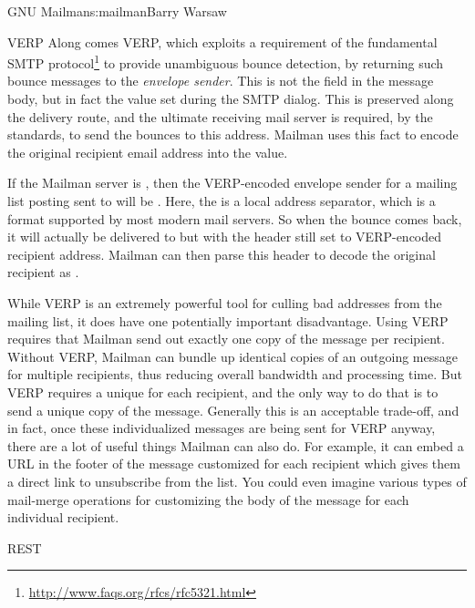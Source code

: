 \begin{aosachapter}{GNU Mailman}{s:mailman}{Barry Warsaw}
\begin{aosasect1}{VERP}
Along comes VERP, which exploits a requirement of the fundamental SMTP
protocol\footnote{\url{http://www.faqs.org/rfcs/rfc5321.html}} to
provide unambiguous bounce detection, by returning such bounce
messages to the \emph{envelope sender}.  This is not the 
field in the message body, but in fact the  value set
during the SMTP dialog.  This is preserved along the delivery route,
and the ultimate receiving mail server is required, by the standards, to
send the bounces to this address.  Mailman uses this fact to encode
the original recipient email address into the  value.

If the Mailman server is
, then the VERP-encoded envelope sender for a mailing list
posting sent to  will be
.  Here, the \code{+}
is a local address separator, which is a format supported by most
modern mail servers.  So when the bounce comes back, it will actually
be delivered to  but with the
 header still set to VERP-encoded recipient address.
Mailman can then parse this  header to decode the original
recipient as .

While VERP is an extremely powerful tool for culling bad addresses
from the mailing list, it does have one potentially important
disadvantage.  Using VERP requires that Mailman send out exactly one
copy of the message per recipient.  Without VERP, Mailman can bundle
up identical copies of an outgoing message for multiple recipients,
thus reducing overall bandwidth and processing time.  But VERP
requires a unique  for each recipient, and the only
way to do that is to send a unique copy of the message.  Generally
this is an acceptable trade-off, and in fact, once these
individualized messages are being sent for VERP anyway, there are a
lot of useful things Mailman can also do.  For example, it can embed a
URL in the footer of the message customized for each recipient which
gives them a direct link to unsubscribe from the list.  You could even
imagine various types of mail-merge operations for customizing
the body of the message for each individual recipient.

\end{aosasect1}

\begin{aosasect1}{REST}


\end{aosasect1}
\end{aosachapter}
